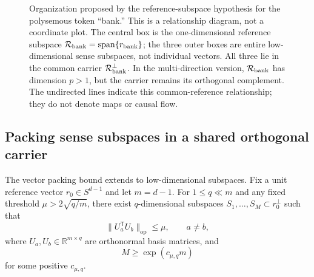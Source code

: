 \documentclass[
  aps,
  reprint,
  superscriptaddress,
  floatfix,
  nofootinbib,
  longbibliography
]{revtex4-2}
\newcommand{\R}{\mathbb{R}}
\newcommand{\Sph}[1]{S^{#1}}
\newcommand{\T}{^{\mathsf{T}}}
\newcommand{\opnorm}[1]{\lVert #1 \rVert_{\mathrm{op}}}
\DeclareMathOperator{\spanop}{span}
\begin{document}
\begin{figure}[t]
\centering
{}
\caption{%
Organization proposed by the reference-subspace hypothesis for the
polysemous token ``bank.'' This is a relationship diagram, not a coordinate
plot. The central box is the one-dimensional reference subspace
$\mathcal R_{\rm bank}=\spanop\{r_{\rm bank}\}$; the three outer boxes are
entire low-dimensional sense subspaces, not individual vectors. All three
lie in the common carrier $\mathcal R_{\rm bank}^{\perp}$. In the
multi-direction version, $\mathcal R_{\rm bank}$ has dimension $p>1$, but
the carrier remains its orthogonal complement. The undirected lines indicate
this common-reference relationship; they do not denote maps or causal flow.
}
\label{fig:reference-subspace}
\end{figure}

\subsection{Packing sense subspaces in a shared orthogonal carrier}
\label{sec:grassmann}

The vector packing bound extends to low-dimensional subspaces. Fix a unit
reference vector $r_0\in\Sph{d-1}$ and let $m=d-1$. For $1\le q\ll m$ and
any fixed threshold $\mu>2\sqrt{q/m}$, there exist $q$-dimensional
subspaces $S_1,\dots,S_M\subset r_0^\perp$ such that
%
\begin{equation}
\label{eq:grassmann-coherence}
\opnorm{U_a\T U_b}\le \mu,\qquad a\neq b,
\end{equation}
%
where $U_a,U_b\in\R^{m\times q}$ are orthonormal basis matrices, and
%
\begin{equation}
\label{eq:grassmann-count}
M\ge \exp(c_{\mu,q}m)
\end{equation}
%
for some positive $c_{\mu,q}$.
\end{document}
